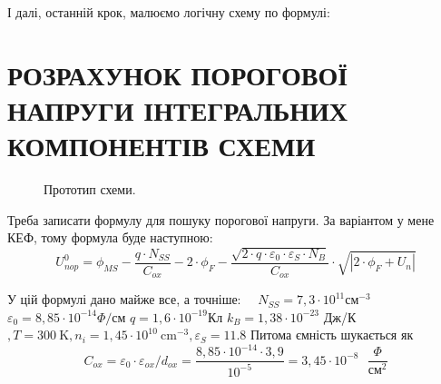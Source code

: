 \documentclass[a4paper,14pt]{extreport}
\begin{document}
	І далі, останній крок, малюємо логічну схему по формулі:


	\begin{figure}[h!]
	\label{ris6}
	\end{figure}


\newpage
\chapter{РОЗРАХУНОК ПОРОГОВОЇ НАПРУГИ ІНТЕГРАЛЬНИХ КОМПОНЕНТІВ СХЕМИ}
	\begin{figure}[h!]
	\caption{Прототип схеми.}
	\label{ris1}
	\end{figure}

	Треба записати формулу для пошуку порогової напруги. За варіантом  у мене КЕФ, тому формула буде наступною:
	\begin{equation}
	U_{n o p}^{0}=\phi_{M S}-\dfrac{q \cdot N_{S S}}{C_{o x}}-2 \cdot \phi_{F}-\dfrac{\sqrt{2 \cdot q \cdot \varepsilon_{0} \cdot \varepsilon_{S} \cdot N_{B}}}{C_{o x}} \cdot \sqrt{\left|2 \cdot \phi_{F}+U_{n}\right|}
	\end{equation}

	У цій формулі
	дано майже все, а точніше: $\quad N_{S S}=7,3 \cdot 10^{11} \text{см}^{-3}$
	$\varepsilon_{0}=8,85 \cdot 10^{-14} \Phi / \text{см}$
	$q=1,6 \cdot 10^{-19}\text{Кл}$
	$k_{B}=1,38 \cdot 10^{-23}$ Дж/К $, T=300 \mathrm{~K}, n_{i}=1,45 \cdot 10^{10} \mathrm{~cm}^{-3}, \varepsilon_{S}=11.8$
	Питома ємність шукається як
	\begin{equation}
	C_{o x}=\varepsilon_{0} \cdot \varepsilon_{o x} / d_{o x}=\dfrac{8,85 \cdot 10^{-14} \cdot 3,9}{10^{-5}}=3,45 \cdot 10^{-8}\text{ } \dfrac{\Phi}{\text{см}^{2}}
	\end{equation}
\end{document}

